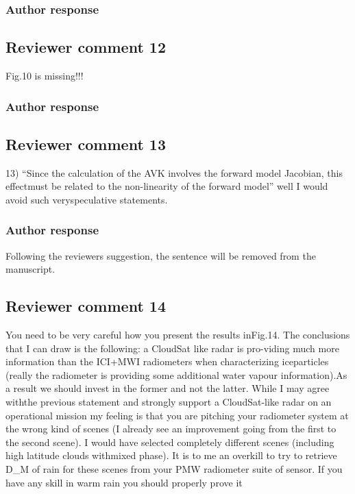 \documentclass[11pt]{scrartcl}
\begin{document}
\subsubsection*{Author response}

\subsection*{Reviewer comment 12}
Fig.10 is missing!!!
\subsubsection*{Author response}

\subsection*{Reviewer comment 13}
13) “Since the calculation of the AVK involves the forward model Jacobian, this effectmust be related to the non-linearity of the forward model” well I would avoid such veryspeculative statements.

\subsubsection*{Author response}

Following the reviewers suggestion, the sentence will be removed from the manuscript.



\subsection*{Reviewer comment 14}
You need to be very careful how you present the results inFig.14. The
conclusions that I can draw is the following: a CloudSat like radar is
pro-viding much more information than the ICI+MWI radiometers when
characterizing iceparticles (really the radiometer is providing some additional
water vapour information).As a result we should invest in the former and not the
latter. While I may agree withthe previous statement and strongly support a
CloudSat-like radar on an operational mission my feeling is that you are
pitching your radiometer system at the wrong kind of scenes (I already see an
improvement going from the first to the second scene). I would have selected
completely different scenes (including high latitude clouds withmixed phase). It
is to me an overkill to try to retrieve D_M of rain for these scenes from your
PMW radiometer suite of sensor. If you have any skill in warm rain you
should properly prove it
\end{document}
